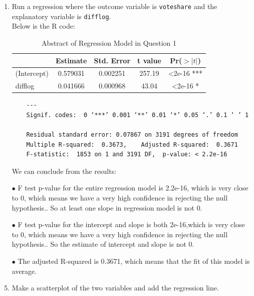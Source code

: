 \documentclass[12pt,letterpaper]{article}
\begin{document}
	\begin{enumerate}
		\item Run a regression where the outcome variable is \texttt{voteshare} and the explanatory variable is \texttt{difflog}. \\

		Below is the R code:
		
		
	\begin{table}[ht]
	\centering
	\caption{Abstract of Regression Model in Question 1}
		\begin{tabular}{lcccc}
			\toprule
			& Estimate & Std. Error & t value & Pr($>|t|$) \\
			\midrule
			(Intercept) & 0.579031 &0.002251 & 257.19 & <2e-16 *** \\
			difflog & 0.041666 & 0.000968 & 43.04 & <2e-16 * \\
			\bottomrule
		\end{tabular} 
	\end{table}
	\begin{verbatim}
	---
	Signif. codes:  0 ‘***’ 0.001 ‘**’ 0.01 ‘*’ 0.05 ‘.’ 0.1 ‘ ’ 1
	
	Residual standard error: 0.07867 on 3191 degrees of freedom
	Multiple R-squared:  0.3673,	Adjusted R-squared:  0.3671 
	F-statistic:  1853 on 1 and 3191 DF,  p-value: < 2.2e-16
	\end{verbatim}
		We can conclude from the results:
			\item[$\bullet$] F test p-value for the entire regression model is 2.2e-16, which is very close to 0, which means we have a very high confidence in rejecting the null hypothesis.. So at least one slope in regression model is not 0.
			\item[$\bullet$] F test p-value for the intercept and slope is both 2e-16,which is very close to 0, which means we have a very high confidence in rejecting the null hypothesis.. So the estimate of intercept and slope is not 0.
			 \item[$\bullet$] The adjusted R-squared is 0.3671, which means that the fit of this model is average.
		
		\newpage
		
		\item Make a scatterplot of the two variables and add the regression line. \\
		

\end{enumerate}
\end{document}

